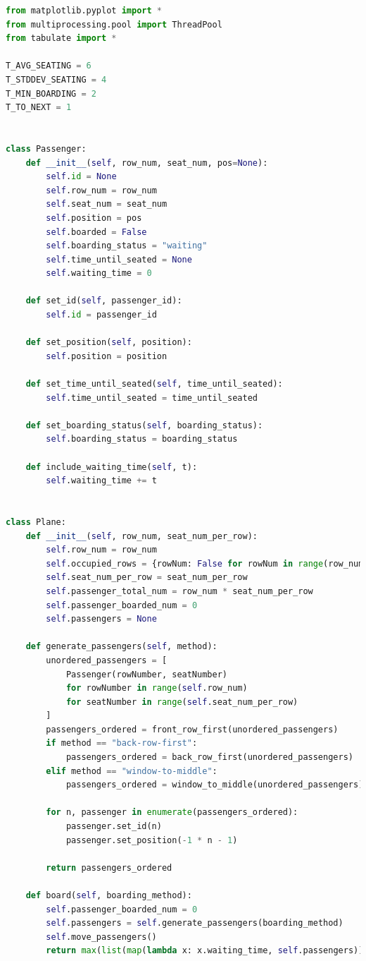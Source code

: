 \documentclass[12pt]{article}
\begin{document}
\begin{lstlisting}[language=python]
from matplotlib.pyplot import *
from multiprocessing.pool import ThreadPool
from tabulate import *

T_AVG_SEATING = 6
T_STDDEV_SEATING = 4
T_MIN_BOARDING = 2
T_TO_NEXT = 1


class Passenger:
    def __init__(self, row_num, seat_num, pos=None):
        self.id = None
        self.row_num = row_num
        self.seat_num = seat_num
        self.position = pos
        self.boarded = False
        self.boarding_status = "waiting"
        self.time_until_seated = None
        self.waiting_time = 0

    def set_id(self, passenger_id):
        self.id = passenger_id

    def set_position(self, position):
        self.position = position

    def set_time_until_seated(self, time_until_seated):
        self.time_until_seated = time_until_seated

    def set_boarding_status(self, boarding_status):
        self.boarding_status = boarding_status

    def include_waiting_time(self, t):
        self.waiting_time += t


class Plane:
    def __init__(self, row_num, seat_num_per_row):
        self.row_num = row_num
        self.occupied_rows = {rowNum: False for rowNum in range(row_num)}
        self.seat_num_per_row = seat_num_per_row
        self.passenger_total_num = row_num * seat_num_per_row
        self.passenger_boarded_num = 0
        self.passengers = None

    def generate_passengers(self, method):
        unordered_passengers = [
            Passenger(rowNumber, seatNumber)
            for rowNumber in range(self.row_num)
            for seatNumber in range(self.seat_num_per_row)
        ]
        passengers_ordered = front_row_first(unordered_passengers)
        if method == "back-row-first":
            passengers_ordered = back_row_first(unordered_passengers)
        elif method == "window-to-middle":
            passengers_ordered = window_to_middle(unordered_passengers)

        for n, passenger in enumerate(passengers_ordered):
            passenger.set_id(n)
            passenger.set_position(-1 * n - 1)

        return passengers_ordered

    def board(self, boarding_method):
        self.passenger_boarded_num = 0
        self.passengers = self.generate_passengers(boarding_method)
        self.move_passengers()
        return max(list(map(lambda x: x.waiting_time, self.passengers))) / 60


\end{lstlisting}
\end{document}
